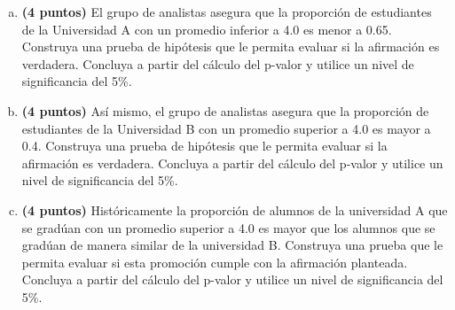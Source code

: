 \documentclass[../main.tex]{subfiles}
\begin{document}
\begin{enumerate}[(a)]

\item \textbf{(4 puntos)} El grupo de analistas asegura que la proporción de estudiantes de la Universidad A con un promedio inferior a 4.0 es menor a 0.65. Construya una prueba de hipótesis que le permita evaluar si la afirmación es verdadera. Concluya a partir del cálculo del p-valor y utilice un nivel de significancia del 5\%.

\item \textbf{(4 puntos)} Así mismo, el grupo de analistas asegura que la proporción de estudiantes de la Universidad B con un promedio superior a 4.0 es mayor a 0.4. Construya una prueba de hipótesis que le permita evaluar si la afirmación es verdadera. Concluya a partir del cálculo del p-valor y utilice un nivel de significancia del 5\%.

\item \textbf{(4 puntos)} Históricamente la proporción de alumnos de la universidad A que se gradúan con un promedio superior a 4.0 es mayor que los alumnos que se gradúan de manera similar de la universidad B. Construya una prueba que le permita evaluar si esta promoción cumple con la afirmación planteada. Concluya a partir del cálculo del p-valor y utilice un nivel de
significancia del 5\%.

\end{enumerate}
\end{document}
